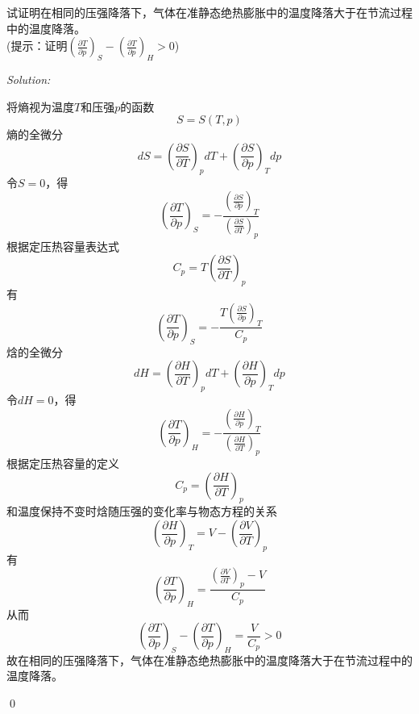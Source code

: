 \documentclass[12pt,a4paper]{article}
\newenvironment{problem}[2][Problem]{\begin{trivlist}
\item[\hskip \labelsep {\bfseries #1}\hskip \labelsep {\bfseries #2.}]}{\end{trivlist}}
\newenvironment{sol}
    {\emph{Solution:}
    }
    {
    \qed
    }
\begin{document}
\begin{problem}{2.6}
试证明在相同的压强降落下，气体在准静态绝热膨胀中的温度降落大于在节流过程中的温度降落。\\
(提示：证明$\left(\frac{\partial T}{\partial p}\right)_S-\left(\frac{\partial T}{\partial p}\right)_H>0$)
\end{problem}
\begin{sol}
将熵视为温度$T$和压强$p$的函数
\begin{equation}
S=S(T,p)
\end{equation}
熵的全微分
\begin{equation}
dS=\left(\frac{\partial S}{\partial T}\right)_pdT+\left(\frac{\partial S}{\partial p}\right)_Tdp
\end{equation}
令$S=0$，得
\begin{equation}
\left(\frac{\partial T}{\partial p}\right)_S=-\frac{\left(\frac{\partial S}{\partial p}\right)_T}{\left(\frac{\partial S}{\partial T}\right)_p}
\end{equation}
根据定压热容量表达式
\begin{equation}
C_p=T\left(\frac{\partial S}{\partial T}\right)_p
\end{equation}
有
\begin{equation}
\left(\frac{\partial T}{\partial p}\right)_S=-\frac{T\left(\frac{\partial S}{\partial p}\right)_T}{C_p}
\end{equation}
焓的全微分
\begin{equation}
dH=\left(\frac{\partial H}{\partial T}\right)_pdT+\left(\frac{\partial H}{\partial p}\right)_Tdp
\end{equation}
令$dH=0$，得
\begin{equation}
\left(\frac{\partial T}{\partial p}\right)_H=-\frac{\left(\frac{\partial H}{\partial p}\right)_T}{\left(\frac{\partial H}{\partial T}\right)_p}
\end{equation}
根据定压热容量的定义
\begin{equation}
C_p=\left(\frac{\partial H}{\partial T}\right)_p
\end{equation}
和温度保持不变时焓随压强的变化率与物态方程的关系
\begin{equation}
\left(\frac{\partial H}{\partial p}\right)_T=V-\left(\frac{\partial V}{\partial T}\right)_p
\end{equation}
有
\begin{equation}
\left(\frac{\partial T}{\partial p}\right)_H=\frac{\left(\frac{\partial V}{\partial T}\right)_p-V}{C_p}
\end{equation}
从而
\begin{equation}
\left(\frac{\partial T}{\partial p}\right)_S-\left(\frac{\partial T}{\partial p}\right)_H=\frac{V}{C_p}>0
\end{equation}
故在相同的压强降落下，气体在准静态绝热膨胀中的温度降落大于在节流过程中的温度降落。
\end{sol}
\end{document}
